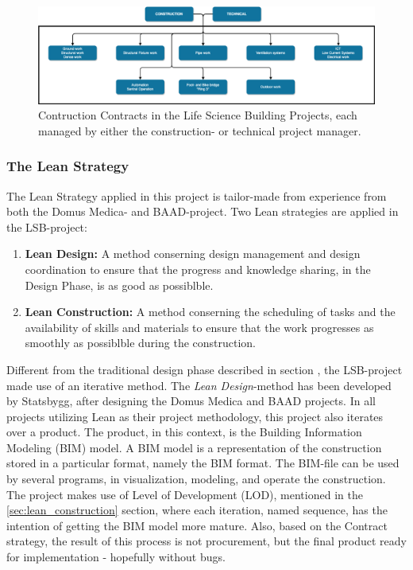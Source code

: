 \begin{figure}
    \centering
    \includegraphics[width=\textwidth]{fig/LVB_contracts.png}
    \caption{Contruction Contracts in the Life Science Building Projects, each managed by either the construction- or technical project manager.}
    \label{fig:project_contracts}
\end{figure}

\subsubsection*{The Lean Strategy}
The Lean Strategy applied in this project is tailor-made from experience from both the Domus Medica- and BAAD-project. Two Lean strategies are applied in the LSB-project: 

\begin{enumerate}
    \item \textbf{Lean Design:} A method conserning design management and design coordination to ensure that the progress and knowledge sharing, in the Design Phase, is as good as possiblble.
    \item \textbf{Lean Construction:} A method conserning the scheduling
    of tasks and the availability of skills and materials to ensure that the work progresses as smoothly as possiblble during the construction.
\end{enumerate}

Different from the traditional design phase described in section , the LSB-project made use of an iterative method. The \textit{Lean Design}-method has been developed by Statsbygg, after designing the Domus Medica and BAAD projects. In all projects utilizing Lean as their project methodology, this project also iterates over a product. The product, in this context, is the Building Information Modeling (BIM) model. A BIM model is a representation of the construction stored in a particular format, namely the BIM format. The BIM-file can be used by several programs, in visualization, modeling, and operate the construction. The project makes use of Level of Development (LOD), mentioned in the \ref{sec:lean_construction} section, where each iteration, named sequence, has the intention of getting the BIM model more mature. Also, based on the Contract strategy, the result of this process is not procurement, but the final product ready for implementation - hopefully without bugs. 

